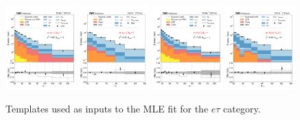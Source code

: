 \begin{figure}[htb!]
    \includegraphics[width=0.24\textwidth]{chapters/Analysis/sectionStatisticalAnalysis/figures/fit/etau_cat_eq2_eq1}
    \includegraphics[width=0.24\textwidth]{chapters/Analysis/sectionStatisticalAnalysis/figures/fit/etau_cat_eq2_eq2}
    \includegraphics[width=0.24\textwidth]{chapters/Analysis/sectionStatisticalAnalysis/figures/fit/etau_cat_gt3_eq1}
    \includegraphics[width=0.24\textwidth]{chapters/Analysis/sectionStatisticalAnalysis/figures/fit/etau_cat_gt3_gt2}
    \caption{Templates used as inputs to the MLE fit for the $e\tau$
    category.}
    \label{fig:fits_templates_etau}
\end{figure}

